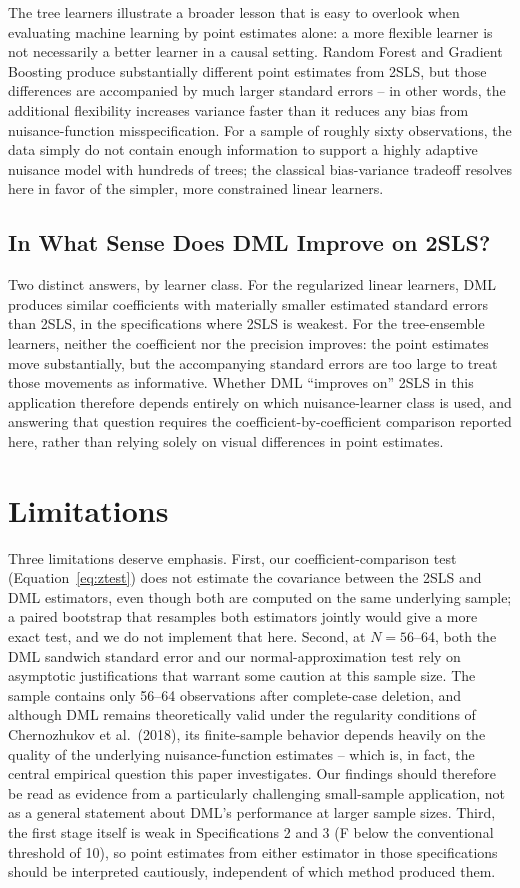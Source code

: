 \documentclass[10pt,twocolumn]{article}
\begin{document}
The tree learners illustrate a broader lesson that is easy to overlook
when evaluating machine learning by point estimates alone: a more
flexible learner is not necessarily a better learner in a causal
setting. Random Forest and Gradient Boosting produce substantially
different point estimates from 2SLS, but those differences are
accompanied by much larger standard errors -- in other words, the
additional flexibility increases variance faster than it reduces any
bias from nuisance-function misspecification. For a sample of roughly
sixty observations, the data simply do not contain enough information
to support a highly adaptive nuisance model with hundreds of trees;
the classical bias-variance tradeoff resolves here in favor of the
simpler, more constrained linear learners.

\subsection{In What Sense Does DML Improve on 2SLS?}
Two distinct answers, by learner class. For the regularized linear
learners, DML produces similar coefficients with materially smaller
estimated standard errors than 2SLS, in the specifications where 2SLS
is weakest. For the tree-ensemble learners, neither the coefficient nor
the precision improves: the point estimates move substantially, but the
accompanying standard errors are too large to treat those movements as
informative. Whether DML ``improves on'' 2SLS in this application
therefore depends entirely on which nuisance-learner class is used, and
answering that question requires the coefficient-by-coefficient
comparison reported here, rather than relying solely on visual
differences in point estimates.

\section{Limitations}
Three limitations deserve emphasis. First, our coefficient-comparison
test (Equation~\ref{eq:ztest}) does not estimate the covariance between
the 2SLS and DML estimators, even though both are computed on the same
underlying sample; a paired bootstrap that resamples both estimators
jointly would give a more exact test, and we do not implement that
here. Second, at $N=56$--64, both the DML sandwich standard error and
our normal-approximation test rely on asymptotic justifications that
warrant some caution at this sample size. The sample contains only
56--64 observations after complete-case deletion, and although DML
remains theoretically valid under the regularity conditions of
Chernozhukov et al.\ (2018), its finite-sample behavior depends heavily
on the quality of the underlying nuisance-function estimates -- which
is, in fact, the central empirical question this paper investigates.
Our findings should therefore be read as evidence from a particularly
challenging small-sample application, not as a general statement about
DML's performance at larger sample sizes. Third, the first stage itself
is weak in Specifications 2 and 3 (F below the conventional threshold
of 10), so point estimates from either estimator in those specifications
should be interpreted cautiously, independent of which method produced
them.
\end{document}
